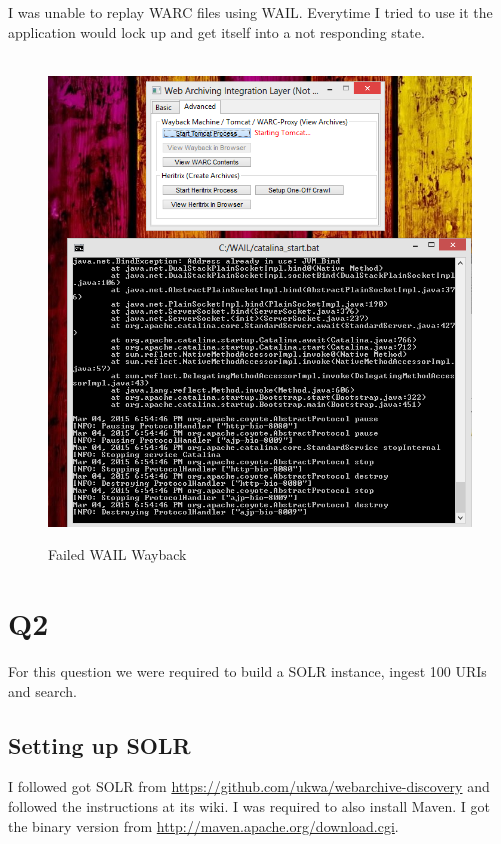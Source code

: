 \documentclass[12pt]{article}
\begin{document}
I was unable to replay WARC files using WAIL.  Everytime I tried to use it the application would lock up and get itself into a not responding state.

\begin{figure}[H]
    \caption{Failed WAIL Wayback}
    \centering
    \includegraphics{failwayback.PNG}
\end{figure}



\section{Q2}

For this question we were required to build a SOLR instance, ingest 100 URIs and search.

\subsection{Setting up SOLR}

I followed got SOLR from \url{https://github.com/ukwa/webarchive-discovery} and followed the instructions at its wiki.  I was required to also install Maven.  I got the binary version from \url{http://maven.apache.org/download.cgi}.
\end{document}
